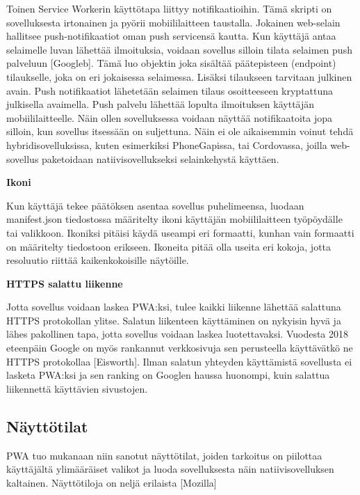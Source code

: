 \documentclass{tktltiki}
\begin{document}
Toinen Service Workerin käyttötapa liittyy notifikaatioihin. Tämä skripti on sovelluksesta irtonainen ja pyörii mobiililaitteen taustalla. Jokainen web-selain hallitsee push-notifikaatiot oman push servicensä kautta. Kun käyttäjä antaa selaimelle luvan lähettää ilmoituksia, voidaan sovellus silloin tilata selaimen push palveluun [Googleb]. Tämä luo objektin joka sisältää päätepisteen (endpoint) tilaukselle, joka on eri jokaisessa selaimessa. Lisäksi tilaukseen tarvitaan julkinen avain. Push notifikaatiot lähetetään selaimen tilaus osoitteeseen kryptattuna julkisella avaimella. Push palvelu lähettää lopulta ilmoituksen käyttäjän mobiililaitteelle. Näin ollen sovelluksessa voidaan näyttää notifikaatoita jopa silloin, kun sovellus itsessään on suljettuna. Näin ei ole aikaisemmin voinut tehdä hybridisovelluksissa, kuten esimerkiksi PhoneGapissa, tai Cordovassa, joilla web-sovellus paketoidaan natiivisovellukseksi selainkehystä käyttäen.

\textbf{Ikoni}

Kun käyttäjä tekee päätöksen asentaa sovellus puhelimeensa, luodaan manifest.json tiedostossa määritelty ikoni käyttäjän mobiililaitteen työpöydälle tai valikkoon. Ikoniksi pitäisi käydä useampi eri formaatti, kunhan vain formaatti on määritelty tiedostoon erikseen. Ikoneita pitää olla useita eri kokoja, jotta resoluutio riittää kaikenkokoisille näytöille.

\textbf{HTTPS salattu liikenne}

Jotta sovellus voidaan laskea PWA:ksi, tulee kaikki liikenne lähettää salattuna HTTPS protokollan ylitse. Salatun liikenteen käyttäminen on nykyisin hyvä ja lähes pakollinen tapa, jotta sovellus voidaan laskea luotettavaksi. Vuodesta 2018 eteenpäin Google on myös rankannut verkkosivuja sen perusteella käyttävätkö ne HTTPS protokollaa [Eisworth]. Ilman salatun yhteyden käyttämistä sovellusta ei lasketa PWA:ksi ja sen ranking on Googlen haussa huonompi, kuin salattua liikennettä käyttävien sivustojen. 

\subsection{Näyttötilat}

PWA tuo mukanaan niin sanotut näyttötilat, joiden tarkoitus on piilottaa käyttäjältä ylimääräiset valikot ja luoda sovelluksesta näin natiivisovelluksen kaltainen. Näyttötiloja on neljä erilaista [Mozilla]
\end{document}
